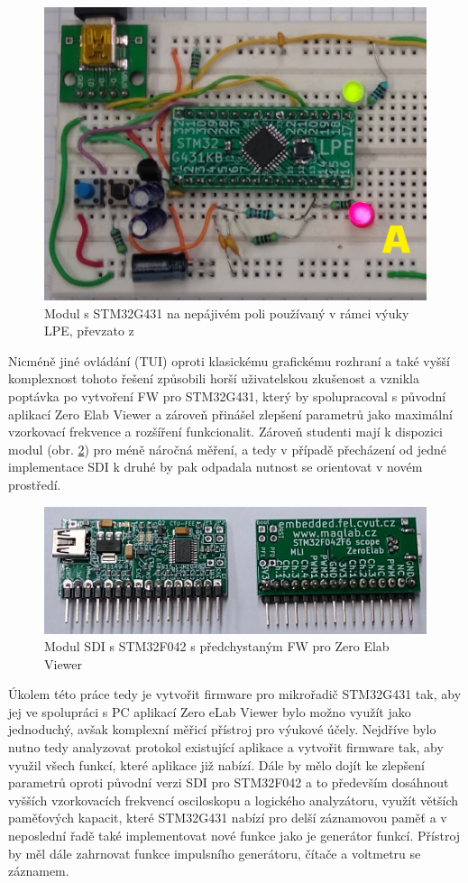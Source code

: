 \begin{figure}[H]
	\centering
	\includegraphics[width=0.5\linewidth]{Figs/Documentation/G431breadboard}
	\caption{Modul s STM32G431 na nepájivém poli používaný v rámci výuky LPE, převzato z \cite{LPE}}
	\label{fig:g431breadboard}
\end{figure}

Nicméně jiné ovládání (TUI) oproti klasickému grafickému rozhraní a také vyšší komplexnost tohoto řešení způsobili horší uživatelskou zkušenost a vznikla poptávka po vytvoření FW pro STM32G431, který by spolupracoval s původní aplikací Zero Elab Viewer a zároveň přinášel zlepšení parametrů jako maximální vzorkovací frekvence a rozšíření funkcionalit. Zároveň studenti mají k dispozici modul (obr. \ref{fig:modulef042}) pro méně náročná měření, a tedy v případě přecházení od jedné implementace SDI k druhé by pak odpadala nutnost se orientovat v novém prostředí. 
\begin{figure}[H]
	\centering
	\includegraphics[width=0.7\linewidth]{Figs/Documentation/module_F042}
	\caption{Modul SDI s STM32F042 s předchystaným FW pro Zero Elab Viewer    }
	\label{fig:modulef042}
\end{figure}
Úkolem této práce tedy je vytvořit firmware pro mikrořadič STM32G431 tak, aby jej ve spolupráci
s PC aplikací Zero eLab Viewer bylo možno využít jako jednoduchý, avšak komplexní měřicí přístroj pro výukové účely. Nejdříve bylo nutno tedy analyzovat protokol existující aplikace a vytvořit firmware tak, aby využil všech funkcí, které aplikace již nabízí. Dále by mělo dojít ke zlepšení parametrů oproti původní verzi SDI pro STM32F042 a to především dosáhnout vyšších vzorkovacích frekvencí osciloskopu a logického analyzátoru, využít větších paměťových kapacit, které STM32G431 nabízí pro  delší záznamovou paměť a v neposlední řadě také implementovat nové funkce jako je generátor funkcí. Přístroj by měl dále zahrnovat funkce impulsního generátoru, čítače a voltmetru se záznamem.
